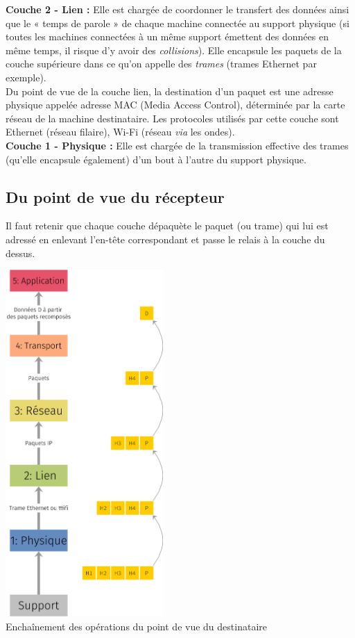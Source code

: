 \textbf{Couche 2 - Lien :} Elle est chargée de coordonner le transfert des données ainsi que le « temps de parole » de chaque machine connectée au support physique (si toutes les machines connectées à un même support émettent des données en même temps, il risque d'y avoir des \textit{collisions}). Elle encapsule les paquets de la couche supérieure dans ce qu'on appelle des \textit{trames} (trames Ethernet par exemple).\\
          Du point de vue de la couche lien, la destination d'un paquet est une adresse physique appelée adresse MAC (Media Access Control), déterminée par la carte réseau de la machine destinataire.
          Les protocoles utilisés par cette couche sont Ethernet (réseau filaire), Wi-Fi (réseau \textit{via} les ondes).\\
\textbf{Couche 1 - Physique :} Elle est chargée de la transmission effective des trames (qu'elle encapsule également) d'un bout à l'autre du support physique.


\subsection{Du point de vue du récepteur}

Il faut retenir que chaque couche dépaquète le paquet (ou trame) qui lui est adressé en enlevant l'en-tête correspondant et passe le relais à la couche du dessus.

\begin{center}
    \includegraphics[width=6cm]{ch-reseaux/img/modele_5_couches_down.png}\\
    \footnotesize{Enchaînement des opérations du point de vue du destinataire}
\end{center}
